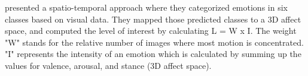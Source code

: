 \newline\newline
\citet{Yeasin:2006:MeasurmentOfInterestFromVideo} presented a spatio-temporal approach where they categorized emotions in six classes based on visual data. They mapped those predicted classes to a 3D affect space, and computed the level of interest by calculating L = W x I.  The weight "W" stands for the relative number of images where most motion is concentrated. "I" represents the intensity of an emotion which is calculated by summing up the values for valence, arousal, and stance (3D affect space).



